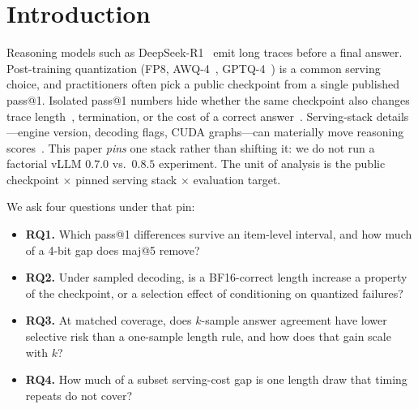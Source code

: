 \documentclass[11pt,a4paper]{article}
\begin{document}
\section{Introduction}
Reasoning models such as DeepSeek-R1~\cite{guo2025deepseekr1} emit long traces before a final answer. Post-training quantization (FP8, AWQ-4~\cite{lin2023awq}, GPTQ-4~\cite{frantar2022gptq}) is a common serving choice, and practitioners often pick a public checkpoint from a single published pass@1. Isolated pass@1 numbers hide whether the same checkpoint also changes trace length~\cite{lian2026quantinflates,liu2025qrm,lotfi2026overthinking}, termination, or the cost of a correct answer~\cite{erol2025costofpass,kurtic2025give}. Serving-stack details---engine version, decoding flags, CUDA graphs---can materially move reasoning scores~\cite{hochlehnert2025sober}. This paper \emph{pins} one stack rather than shifting it: we do not run a factorial vLLM $0.7.0$ vs.\ $0.8.5$ experiment. The unit of analysis is the public checkpoint $\times$ pinned serving stack $\times$ evaluation target.

We ask four questions under that pin:
\begin{itemize}
    \item \textbf{RQ1.} Which pass@1 differences survive an item-level interval, and how much of a 4-bit gap does maj@5 remove?
    \item \textbf{RQ2.} Under sampled decoding, is a BF16-correct length increase a property of the checkpoint, or a selection effect of conditioning on quantized failures?
    \item \textbf{RQ3.} At matched coverage, does $k$-sample answer agreement have lower selective risk than a one-sample length rule, and how does that gain scale with $k$?
    \item \textbf{RQ4.} How much of a subset serving-cost gap is one length draw that timing repeats do not cover?
\end{itemize}
\end{document}

